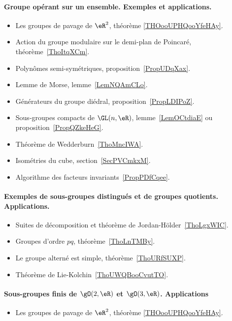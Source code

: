 \paragraph{Groupe opérant sur un ensemble. Exemples et applications.}
\begin{itemize}
    \item Les groupes de pavage de \( \eR^2\), théorème \ref{THOooUPHQooYfeHAy}.
    \item Action du groupe modulaire sur le demi-plan de Poincaré, théorème~\ref{ThoItqXCm}.
    \item Polynômes semi-symétriques, proposition~\ref{PropUDqXax}.
    \item Lemme de Morse, lemme~\ref{LemNQAmCLo}.
    \item Générateurs du groupe diédral, proposition~\ref{PropLDIPoZ}.
    \item Sous-groupes compacts de \( \GL(n,\eR)\), lemme~\ref{LemOCtdiaE} ou proposition~\ref{PropQZkeHeG}.
    \item Théorème de Wedderburn~\ref{ThoMncIWA}.
    \item Isométries du cube, section~\ref{SecPVCmkxM}.
    \item Algorithme des facteurs invariants~\ref{PropPDfCqee}.
\end{itemize}
\paragraph{Exemples de sous-groupes distingués et de groupes quotients. Applications.}
\begin{itemize}
    \item Suites de décomposition et théorème de Jordan-Hölder~\ref{ThoLgxWIC}.
    \item Groupes d'ordre \( pq\), théorème~\ref{ThoLnTMBy}.
    \item Le groupe alterné est simple, théorème~\ref{ThoURfSUXP}.
    \item Théorème de Lie-Kolchin~\ref{ThoUWQBooCvutTO}.
\end{itemize}
\paragraph{Sous-groupes finis de \( \gO(2,\eR)\) et \( \gO(3,\eR)\). Applications}
\begin{itemize}
    \item Les groupes de pavage de \( \eR^2\), théorème \ref{THOooUPHQooYfeHAy}.
\end{itemize}
